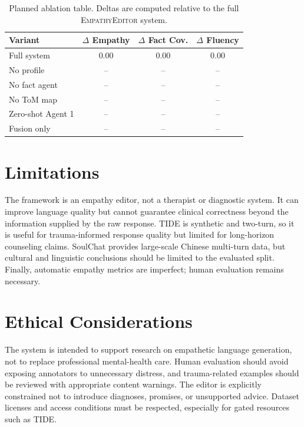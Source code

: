 \documentclass[11pt]{article}
\begin{document}
\begin{table}[t]
\centering
\small
\begin{tabular}{lccc}
\toprule
\textbf{Variant} & \textbf{$\Delta$ Empathy} & \textbf{$\Delta$ Fact Cov.} & \textbf{$\Delta$ Fluency} \\
\midrule
Full system & 0.00 & 0.00 & 0.00 \\
No profile & -- & -- & -- \\
No fact agent & -- & -- & -- \\
No ToM map & -- & -- & -- \\
Zero-shot Agent 1 & -- & -- & -- \\
Fusion only & -- & -- & -- \\
\bottomrule
\end{tabular}
\caption{Planned ablation table. Deltas are computed relative to the full \textsc{EmpathyEditor} system.}
\label{tab:ablation_plan}
\end{table}

\section{Limitations}

The framework is an empathy editor, not a therapist or diagnostic system. It can improve language quality but cannot guarantee clinical correctness beyond the information supplied by the raw response. TIDE is synthetic and two-turn, so it is useful for trauma-informed response quality but limited for long-horizon counseling claims. SoulChat provides large-scale Chinese multi-turn data, but cultural and linguistic conclusions should be limited to the evaluated split. Finally, automatic empathy metrics are imperfect; human evaluation remains necessary.

\section{Ethical Considerations}

The system is intended to support research on empathetic language generation, not to replace professional mental-health care. Human evaluation should avoid exposing annotators to unnecessary distress, and trauma-related examples should be reviewed with appropriate content warnings. The editor is explicitly constrained not to introduce diagnoses, promises, or unsupported advice. Dataset licenses and access conditions must be respected, especially for gated resources such as TIDE.
\end{document}
